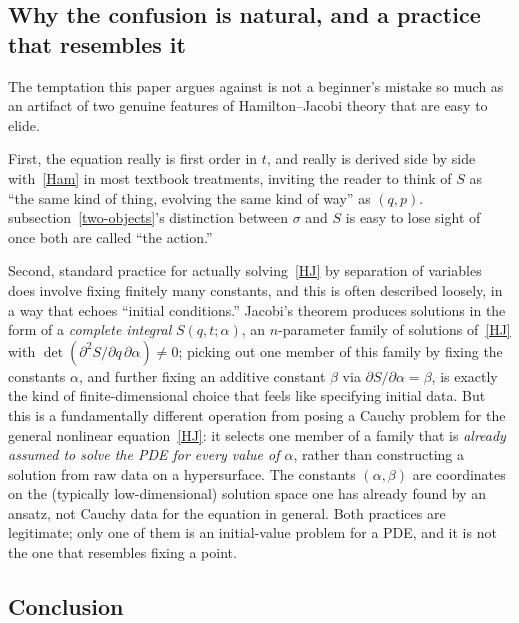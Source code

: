 \subsection{Why the confusion is natural, and a practice that resembles it}
\label{discussion}

The temptation this paper argues against is not a beginner's mistake so much as
an artifact of two genuine features of Hamilton--Jacobi theory that are easy to
elide.

First, the equation really is first order in $t$, and really is derived side by
side with~\eqref{Ham} in most textbook treatments, inviting the reader to think
of $S$ as ``the same kind of thing, evolving the same kind of way'' as $(q,p)$.
subsection~\ref{two-objects}'s distinction between $\sigma$ and $S$ is easy to
lose sight of once both are called ``the action.''

Second, standard practice for actually solving~\eqref{HJ} by separation of
variables does involve fixing finitely many constants, and this is often
described loosely, in a way that echoes ``initial conditions.'' Jacobi's
theorem produces solutions in the form of a \emph{complete integral}
$S(q,t;\alpha)$, an $n$-parameter family of solutions of~\eqref{HJ} with
$\det(\partial^2S/\partial q\,\partial\alpha)\neq0$; picking out one member of
this family by fixing the constants $\alpha$, and further fixing an additive
constant $\beta$ via $\partial S/\partial\alpha=\beta$, is exactly the kind of
finite-dimensional choice that feels like specifying initial data. But this is
a fundamentally different operation from posing a Cauchy problem for the
general nonlinear equation~\eqref{HJ}: it selects one member of a family that
is \emph{already assumed to solve the PDE for every value of $\alpha$}, rather
than constructing a solution from raw data on a hypersurface. The constants
$(\alpha,\beta)$ are coordinates on the (typically low-dimensional) solution
space one has already found by an ansatz, not Cauchy data for the equation in
general. Both practices are legitimate; only one of them is an initial-value
problem for a PDE, and it is not the one that resembles fixing a point.

\subsection{Conclusion}
\label{conclusion}

